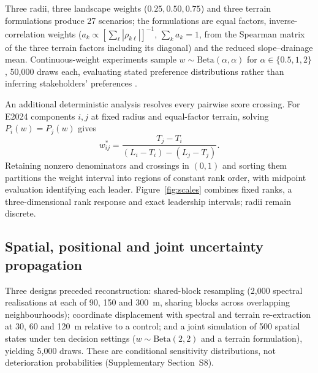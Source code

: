 Three radii, three landscape weights ($0.25,0.50,0.75$) and three terrain formulations produce 27 scenarios; the formulations are equal factors, inverse-correlation weights ($a_k\propto[\sum_\ell|\rho_{k\ell}|]^{-1}$, $\sum_ka_k=1$, from the Spearman matrix of the three terrain factors including its diagonal) and the reduced slope--drainage mean. Continuous-weight experiments sample $w\sim\mathrm{Beta}(\alpha,\alpha)$ for $\alpha\in\{0.5,1,2\}$, 50,000 draws each, evaluating stated preference distributions rather than inferring stakeholders' preferences \citep{lahdelma2001smaa}.

An additional deterministic analysis resolves every pairwise score crossing. For E2024 components $i,j$ at fixed radius and equal-factor terrain, solving $P_i(w)=P_j(w)$ gives
\begin{equation}\label{eq:crossing}
w^*_{ij}=\frac{T_j-T_i}{(L_i-T_i)-(L_j-T_j)}.
\end{equation}
Retaining nonzero denominators and crossings in $(0,1)$ and sorting them partitions the weight interval into regions of constant rank order, with midpoint evaluation identifying each leader. Figure~\ref{fig:scales} combines fixed ranks, a three-dimensional rank response and exact leadership intervals; radii remain discrete.

\subsection{Spatial, positional and joint uncertainty propagation}
Three designs preceded reconstruction: shared-block resampling (2,000 spectral realisations at each of 90, 150 and 300~m, sharing blocks across overlapping neighbourhoods); coordinate displacement with spectral and terrain re-extraction at 30, 60 and 120~m relative to a control; and a joint simulation of 500 spatial states under ten decision settings ($w\sim\mathrm{Beta}(2,2)$ and a terrain formulation), yielding 5,000 draws. These are conditional sensitivity distributions, not deterioration probabilities (Supplementary Section~S8).

